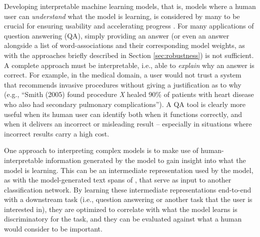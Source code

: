 
Developing interpretable machine learning models, that is, models where a human user can \emph{understand} what the model is learning, is considered by many to be crucial for ensuring usability and accelerating progress \citep{craven1996extracting,Kim2015MindTG, letham2015interpretable, Ribeiro2016WhySI}.  
For many applications of question answering (QA), simply providing an answer (or even an answer alongside a list of word-associations and their corresponding model weights, as with the approaches briefly described in Section \ref{sec:robustness}) is not sufficient. A complete approach must be interpretable, i.e., able to {\em explain} why an answer is correct. 
For example, in the medical domain, a user would not trust a system that recommends invasive procedures without giving a justification as to why (e.g., ``Smith (2005) found procedure \emph{X} healed 90\% of patients with heart disease who also had secondary pulmonary complications'').  A QA tool is clearly more useful when its human user can identify both when it functions correctly, and when it delivers an incorrect or misleading result -- especially in situations where incorrect results carry a high cost.  

One approach to interpreting complex models is to make use of human-interpretable information generated by the model to gain insight into what the model is learning.  This can be an intermediate representation used by the model, as with the model-generated text spans of \citet{Lei2016RationalizingNP}, that serve as input to another classification network.  
By learning these intermediate representations end-to-end with a downstream task (i.e., question answering or another task that the user is interested in), they are optimized to correlate with what the model learns is discriminatory for the task, and they can be evaluated against what a human would consider to be important.  


